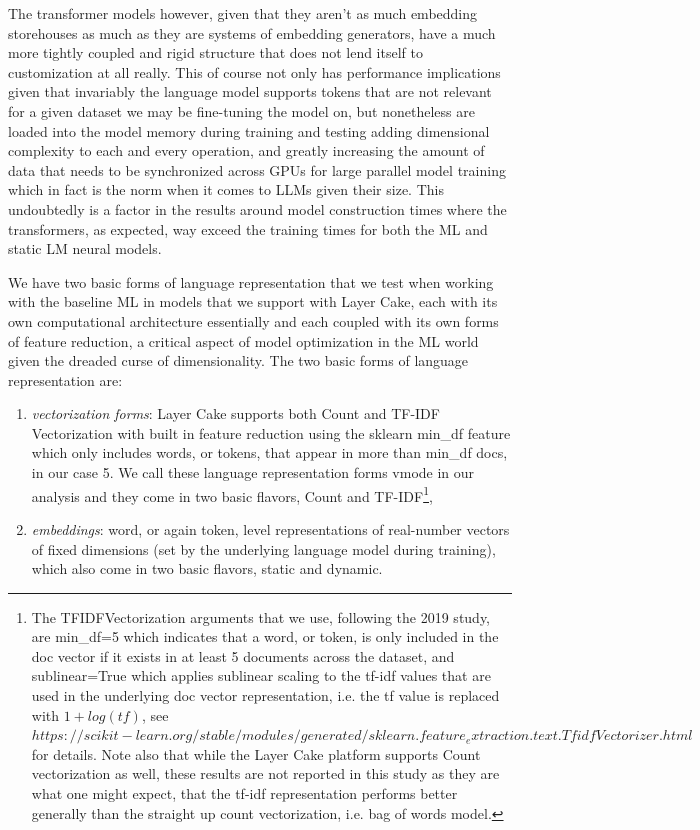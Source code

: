 \documentclass[final]{clv2025}
\begin{document}
The transformer models however, given that they aren’t as much embedding storehouses as much as they are systems of embedding generators, have a much more tightly coupled and rigid structure that does not lend itself to customization at all really. This of course not only has performance implications given that invariably the language model supports tokens that are not relevant for a given dataset we may be fine-tuning the model on, but nonetheless are loaded into the model memory during training and testing adding dimensional complexity to each and every operation, and greatly increasing the amount of data that needs to be synchronized across GPUs for large parallel model training which in fact is the norm when it comes to LLMs given their size. This undoubtedly is a factor in the results around model construction times where the transformers, as expected, way exceed the training times for both the ML and static LM neural models.

We have two basic forms of language representation that we test when working with the baseline ML in models that we support with Layer Cake, each with its own computational architecture essentially and each coupled with its own forms of feature reduction, a critical aspect of model optimization in the ML world given the dreaded curse of dimensionality.  The two basic forms of language representation are:

\begin{enumerate}
	\setlength\itemsep{2pt}
    \item \textit{vectorization forms}: Layer Cake supports both Count and TF-IDF Vectorization with built in feature reduction using the sklearn min\_df feature which only includes words, or tokens, that appear in more than min\_df docs, in our case 5. We call these language representation forms vmode in our analysis and they come in two basic flavors, Count and TF-IDF\footnote{The TFIDFVectorization arguments that we use, following the 2019 study, are min\_df=5 which indicates that a word, or token, is only included in the doc vector if it exists in at least 5 documents across the dataset, and sublinear=True which applies sublinear scaling to the tf-idf values that are used in the underlying doc vector representation, i.e. the tf value is replaced with $1+log(tf)$, see $https://scikit-learn.org/stable/modules/generated/sklearn.feature_extraction.text.TfidfVectorizer.html$ for details. Note also that while the Layer Cake platform supports Count vectorization as well, these results are not reported in this study as they are what one might expect, that the tf-idf representation performs better generally than the straight up count vectorization, i.e. bag of words model.}, 
    \item \textit{embeddings}: word, or again token, level representations of real-number vectors of fixed dimensions (set by the underlying language model during training), which also come in two basic flavors, static and dynamic. 
\end{enumerate}
\end{document}
